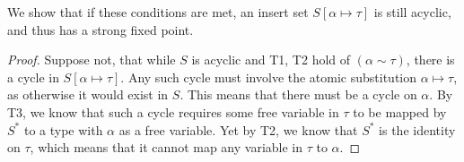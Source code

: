 \documentclass[10pt, letterpaper, oneside]{article}
\begin{document}
We show that if these conditions are met, an insert set \(S[\alpha \mapsto \tau]\) is still acyclic, and thus has a strong fixed point.

\begin{proof}
  Suppose not, that while \(S\) is acyclic and T1, T2 hold of \((\alpha \sim \tau)\), there is a cycle in \(S[\alpha \mapsto \tau]\). Any such cycle must involve the atomic substitution \(\alpha \mapsto \tau\), as otherwise it would exist in \(S\). This means that there must be a cycle on \(\alpha\). By T3, we know that such a cycle requires some free variable in \(\tau\) to be mapped by \(S^\ast\) to a type with \(\alpha\) as a free variable. Yet by T2, we know that \(S^\ast\) is the identity on \(\tau\), which means that it cannot map any variable in \(\tau\) to \(\alpha\).
\end{proof}
\end{document}
